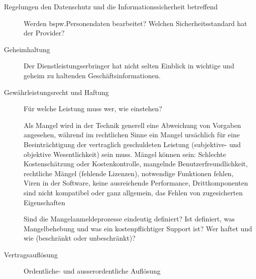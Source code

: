 \begin{description}
  \item[Regelungen den Datenschutz und die Informationssicherheit betreffend]Werden bspw.Personendaten bearbeitet? Welchen Sicherheitsstandard hat der Provider?
  \item[Geheimhaltung] Der Dienstleistungserbringer hat nicht selten Einblick in wichtige und geheim zu haltenden Geschäftsinformationen.
  \item[Gewährleistungsrecht und Haftung] Für welche Leistung muss wer, wie einstehen?

  Als Mangel wird in der Technik generell eine Abweichung von Vorgaben angesehen, während im rechtlichen Sinne ein Mangel ursächlich für eine Beeinträchtigung der vertraglich geschuldeten Leistung (subjektive- und objektive Wesentlichkeit) sein muss.
  Mängel können sein: Schlechte Kostenschätzung oder Kostenkontrolle, mangelnde   Benutzerfreundlichkeit, rechtliche Mängel (fehlende Lizenzen), notwendige Funktionen fehlen, Viren in der Software, keine ausreichende Performance, Drittkomponenten sind nicht kompatibel oder ganz allgemein, das Fehlen von zugesicherten Eigenschaften
  
  Sind die Mangelanmeldeprozesse eindeutig definiert? Ist definiert, was Mangelbehebung und was ein
  kostenpflichtiger Support ist? Wer haftet und wie (beschränkt oder unbeschränkt)?
  
  \item[Vertragsauflösung] Ordentliche- und ausserordentliche Auflösung
\end{description}


